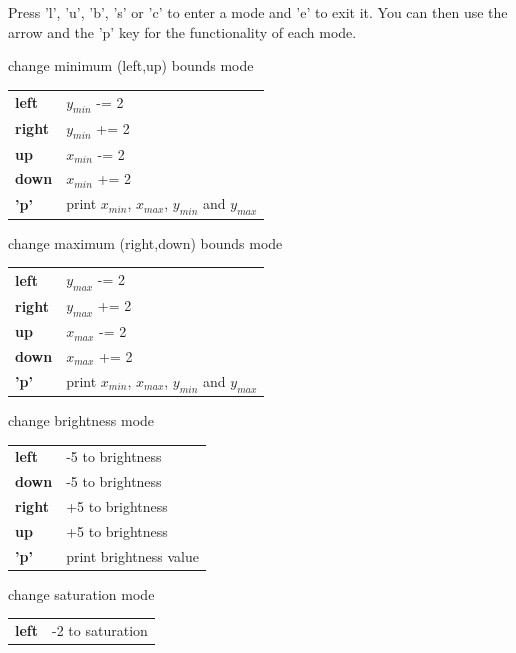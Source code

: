 Press 'l', 'u', 'b', 's' or 'c' to enter a mode and 'e' to exit it. You can
then use the arrow and the 'p' key for the functionality of each mode.

    \begin{description} \itemindent=-15pt
        \item['l'] change minimum (left,up) bounds mode \\
            \begin{tabular}{ll}
                {\bf left } & $y_{min}$ -= 2 \\
                {\bf right} & $y_{min}$ += 2 \\
                {\bf up   } & $x_{min}$ -= 2 \\
                {\bf down } & $x_{min}$ += 2 \\
                {\bf 'p'  } & print $x_{min}$, $x_{max}$, $y_{min}$ and $y_{max}$
            \end{tabular}
        \item['u'] change maximum (right,down) bounds mode \\
            \begin{tabular}{ll}
                {\bf left } & $y_{max}$ -= 2 \\
                {\bf right} & $y_{max}$ += 2 \\
                {\bf up   } & $x_{max}$ -= 2 \\
                {\bf down } & $x_{max}$ += 2 \\
                {\bf 'p'  } & print $x_{min}$, $x_{max}$, $y_{min}$ and $y_{max}$ 
            \end{tabular}
        \item['b']  change brightness mode \\
            \begin{tabular}{ll} 
                {\bf left } & -5 to brightness \\
                {\bf down } & -5 to brightness \\
                {\bf right} & +5 to brightness \\
                {\bf up   } & +5 to brightness \\
                {\bf 'p'  } & print brightness value 
            \end{tabular}
        \item['s'] change saturation mode \\
            \begin{tabular}{ll}
                {\bf left } & -2 to saturation \\

\end{tabular}
\end{description}
